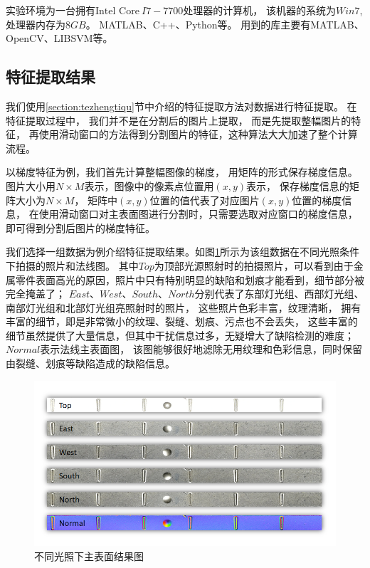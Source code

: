 实验环境为一台拥有$\mbox{Intel Core}
~I7-7700$处理器的计算机，
该机器的系统为$Win7$,
处理器内存为$8GB$。
MATLAB\cite{MATLAB:2017}、C++、Python等。
用到的库主要有MATLAB\cite{MATLAB:2017}、OpenCV\cite{opencv_library}、LIBSVM\cite{CC01a}等。

\subsection{特征提取结果}

我们使用\ref{section:tezhengtiqu}节中介绍的特征提取方法对数据进行特征提取。
在特征提取过程中，
我们并不是在分割后的图片上提取，
而是先提取整幅图片的特征，
再使用滑动窗口的方法得到分割图片的特征，这种算法大大加速了整个计算流程。

以梯度特征为例，我们首先计算整幅图像的梯度，
用矩阵的形式保存梯度信息。
图片大小用$N\times M$表示，图像中的像素点位置用$(x,y)$表示，
保存梯度信息的矩阵大小为$N\times M$，
矩阵中$(x,y)$位置的值代表了对应图片$(x,y)$位置的梯度信息，
在使用滑动窗口对主表面图进行分割时，只需要选取对应窗口的梯度信息，
即可得到分割后图片的梯度特征。

我们选择一组数据为例介绍特征提取结果。如图\ref{fig:butogndengguangzhankaitu}所示为该组数据在不同光照条件下拍摄的照片和法线图。
其中$Top$为顶部光源照射时的拍摄照片，可以看到由于金属零件表面高光的原因，照片中只有特别明显的缺陷和划痕才能看到，细节部分被完全掩盖了；
$East$、$West$、$South$、$North$分别代表了东部灯光组、西部灯光组、南部灯光组和北部灯光组亮照射时的照片，
这些照片色彩丰富，纹理清晰，
拥有丰富的细节，即是非常微小的纹理、裂缝、划痕、污点也不会丢失，
这些丰富的细节虽然提供了大量信息，但其中干扰信息过多，无疑增大了缺陷检测的难度；
$Normal$表示法线主表面图，
该图能够很好地滤除无用纹理和色彩信息，同时保留由裂缝、划痕等缺陷造成的缺陷信息。

\begin{figure}[htbp]
\centering
\includegraphics[width=1.0\linewidth]{figures/butongdengguangzhankaitu.png}
\caption{不同光照下主表面结果图}
\label{fig:butogndengguangzhankaitu}
\end{figure}


